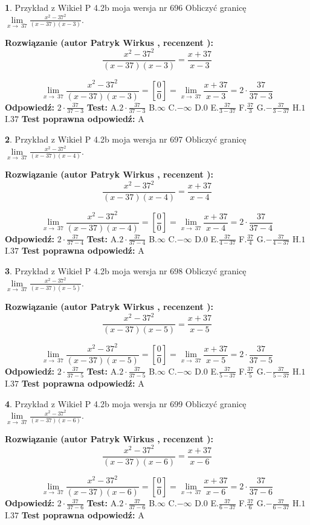 \documentclass[12pt, a4paper]{article}
\theoremstyle{definition} %
\newtheorem{zad}{}
\newcommand{\zadStart}[1]{\begin{zad}#1\newline}
\newcommand{\zadStop}{\end{zad}}
\newcommand{\rozwStart}[2]{\noindent \textbf{Rozwiązanie (autor #1 , recenzent #2): }\newline}
\newcommand{\rozwStop}{\newline}
\newcommand{\odpStart}{\noindent \textbf{Odpowiedź:}\newline}
\newcommand{\odpStop}{\newline}
\newcommand{\testStart}{\noindent \textbf{Test:}\newline}
\newcommand{\testStop}{\newline}
\newcommand{\kluczStart}{\noindent \textbf{Test poprawna odpowiedź:}\newline}
\newcommand{\kluczStop}{\newline}
\begin{document}
\zadStart{Przykład z Wikieł P 4.2b moja wersja nr 696}
Obliczyć granicę $\lim\limits_{x\to\ 37}\frac{x^{2}-37^{2}}{(x-37)(x-3)}$.
\zadStop
\rozwStart{Patryk Wirkus}{}
$$\frac{x^{2}-37^{2}}{(x-37)(x-3)}=\frac{x+37}{x-3}$$

$$\lim\limits_{x\to\ 37}\frac{x^{2}-37^{2}}{(x-37)(x-3)}=[\frac{0}{0}]=\lim\limits_{x\to\ 37}\frac{x+37}{x-3}=2 \cdot \frac{37}{37-3}$$
\rozwStop
\odpStart
$2 \cdot \frac{37}{37-3}$
\odpStop
\testStart
A.$2 \cdot \frac{37}{37-3}$
B.$\infty$
C.$-\infty$
D.$0$
E.$\frac{37}{3-37}$
F.$\frac{37}{3}$
G.$-\frac{37}{3-37}$
H.$1$
I.$37$
\testStop
\kluczStart
A
\kluczStop



\zadStart{Przykład z Wikieł P 4.2b moja wersja nr 697}
Obliczyć granicę $\lim\limits_{x\to\ 37}\frac{x^{2}-37^{2}}{(x-37)(x-4)}$.
\zadStop
\rozwStart{Patryk Wirkus}{}
$$\frac{x^{2}-37^{2}}{(x-37)(x-4)}=\frac{x+37}{x-4}$$

$$\lim\limits_{x\to\ 37}\frac{x^{2}-37^{2}}{(x-37)(x-4)}=[\frac{0}{0}]=\lim\limits_{x\to\ 37}\frac{x+37}{x-4}=2 \cdot \frac{37}{37-4}$$
\rozwStop
\odpStart
$2 \cdot \frac{37}{37-4}$
\odpStop
\testStart
A.$2 \cdot \frac{37}{37-4}$
B.$\infty$
C.$-\infty$
D.$0$
E.$\frac{37}{4-37}$
F.$\frac{37}{4}$
G.$-\frac{37}{4-37}$
H.$1$
I.$37$
\testStop
\kluczStart
A
\kluczStop



\zadStart{Przykład z Wikieł P 4.2b moja wersja nr 698}
Obliczyć granicę $\lim\limits_{x\to\ 37}\frac{x^{2}-37^{2}}{(x-37)(x-5)}$.
\zadStop
\rozwStart{Patryk Wirkus}{}
$$\frac{x^{2}-37^{2}}{(x-37)(x-5)}=\frac{x+37}{x-5}$$

$$\lim\limits_{x\to\ 37}\frac{x^{2}-37^{2}}{(x-37)(x-5)}=[\frac{0}{0}]=\lim\limits_{x\to\ 37}\frac{x+37}{x-5}=2 \cdot \frac{37}{37-5}$$
\rozwStop
\odpStart
$2 \cdot \frac{37}{37-5}$
\odpStop
\testStart
A.$2 \cdot \frac{37}{37-5}$
B.$\infty$
C.$-\infty$
D.$0$
E.$\frac{37}{5-37}$
F.$\frac{37}{5}$
G.$-\frac{37}{5-37}$
H.$1$
I.$37$
\testStop
\kluczStart
A
\kluczStop



\zadStart{Przykład z Wikieł P 4.2b moja wersja nr 699}
Obliczyć granicę $\lim\limits_{x\to\ 37}\frac{x^{2}-37^{2}}{(x-37)(x-6)}$.
\zadStop
\rozwStart{Patryk Wirkus}{}
$$\frac{x^{2}-37^{2}}{(x-37)(x-6)}=\frac{x+37}{x-6}$$

$$\lim\limits_{x\to\ 37}\frac{x^{2}-37^{2}}{(x-37)(x-6)}=[\frac{0}{0}]=\lim\limits_{x\to\ 37}\frac{x+37}{x-6}=2 \cdot \frac{37}{37-6}$$
\rozwStop
\odpStart
$2 \cdot \frac{37}{37-6}$
\odpStop
\testStart
A.$2 \cdot \frac{37}{37-6}$
B.$\infty$
C.$-\infty$
D.$0$
E.$\frac{37}{6-37}$
F.$\frac{37}{6}$
G.$-\frac{37}{6-37}$
H.$1$
I.$37$
\testStop
\kluczStart
A
\kluczStop
\end{document}
